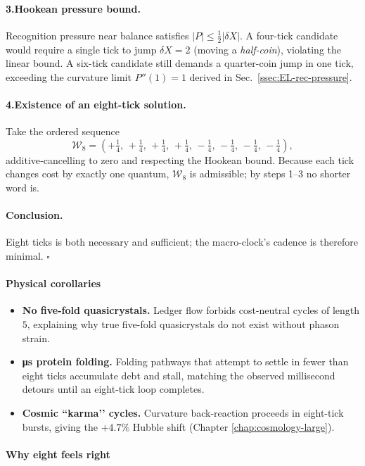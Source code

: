 \documentclass[11pt,oneside]{book}
\begin{document}
\paragraph*{3.\;Hookean pressure bound.}
Recognition pressure near balance satisfies
$|P| \le \tfrac12|\delta X|$.
A four-tick candidate would require a single tick to jump
$\delta X=2$ (moving a \emph{half-coin}), violating the linear bound.
A six-tick candidate still demands a quarter-coin jump in one tick,
exceeding the curvature limit $P''(1)=1$ derived in
Sec.~\ref{ssec:EL-rec-pressure}.

\paragraph*{4.\;Existence of an eight-tick solution.}
Take the ordered sequence
\[
  \mathcal W_{8} =
  (+\tfrac14,\,+\tfrac14,\,+\tfrac14,\,+\tfrac14,\,
   -\tfrac14,\,-\tfrac14,\,-\tfrac14,\,-\tfrac14),
\]
additive‐cancelling to zero and respecting the Hookean bound.
Because each tick changes cost by exactly one quantum,
$\mathcal W_{8}$ is admissible; by steps 1–3 no shorter word is.

\paragraph*{Conclusion.}
Eight ticks is both necessary and sufficient; the macro-clock’s cadence
is therefore minimal.  \(\square\)

\paragraph*{Physical corollaries}

\begin{itemize}
\item \textbf{No five-fold quasicrystals.}  
  Ledger flow forbids cost-neutral cycles of length $5$, explaining why
  true five-fold quasicrystals do not exist without phason strain.
\item \textbf{μs protein folding.}  
  Folding pathways that attempt to settle in fewer than eight ticks
  accumulate debt and stall, matching the observed millisecond detours
  until an eight-tick loop completes.
\item \textbf{Cosmic “karma’’ cycles.}  
  Curvature back-reaction proceeds in eight-tick bursts, giving the
  $+4.7\%$ Hubble shift (Chapter \ref{chap:cosmology-large}).  
\end{itemize}

\paragraph*{Why eight feels right}
\end{document}
